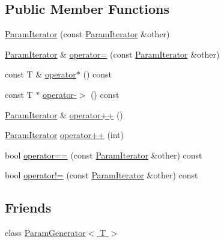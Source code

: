 \subsection*{Public Member Functions}
\begin{DoxyCompactItemize}
\item 
\hyperlink{classtesting_1_1internal_1_1_param_iterator_aa10585055ee055e304703a3004f24f33}{Param\-Iterator} (const \hyperlink{classtesting_1_1internal_1_1_param_iterator}{Param\-Iterator} \&other)
\item 
\hyperlink{classtesting_1_1internal_1_1_param_iterator}{Param\-Iterator} \& \hyperlink{classtesting_1_1internal_1_1_param_iterator_a8019f54ea1c66ca39ffdec47acfabfe6}{operator=} (const \hyperlink{classtesting_1_1internal_1_1_param_iterator}{Param\-Iterator} \&other)
\item 
const T \& \hyperlink{classtesting_1_1internal_1_1_param_iterator_ac06372831efcdaeadccd2fb2786f5a95}{operator$\ast$} () const 
\item 
const T $\ast$ \hyperlink{classtesting_1_1internal_1_1_param_iterator_aaf248ff7a1b5bb82d6ebb96c669aa75c}{operator-\/$>$} () const 
\item 
\hyperlink{classtesting_1_1internal_1_1_param_iterator}{Param\-Iterator} \& \hyperlink{classtesting_1_1internal_1_1_param_iterator_ab0922f2f554fb3beaf13c442da605e8d}{operator++} ()
\item 
\hyperlink{classtesting_1_1internal_1_1_param_iterator}{Param\-Iterator} \hyperlink{classtesting_1_1internal_1_1_param_iterator_af51e17827dd54977165937550c0fb030}{operator++} (int)
\item 
bool \hyperlink{classtesting_1_1internal_1_1_param_iterator_a1a3a858e3d2d101fe561a88affcad0d5}{operator==} (const \hyperlink{classtesting_1_1internal_1_1_param_iterator}{Param\-Iterator} \&other) const 
\item 
bool \hyperlink{classtesting_1_1internal_1_1_param_iterator_a930d5da5e7cef080b4992b48f9e79239}{operator!=} (const \hyperlink{classtesting_1_1internal_1_1_param_iterator}{Param\-Iterator} \&other) const 
\end{DoxyCompactItemize}
\subsection*{Friends}
\begin{DoxyCompactItemize}
\item 
class \hyperlink{classtesting_1_1internal_1_1_param_iterator_ab73a355ae191f2f7eab54b65ca557714}{Param\-Generator$<$ T $>$}
\end{DoxyCompactItemize}


